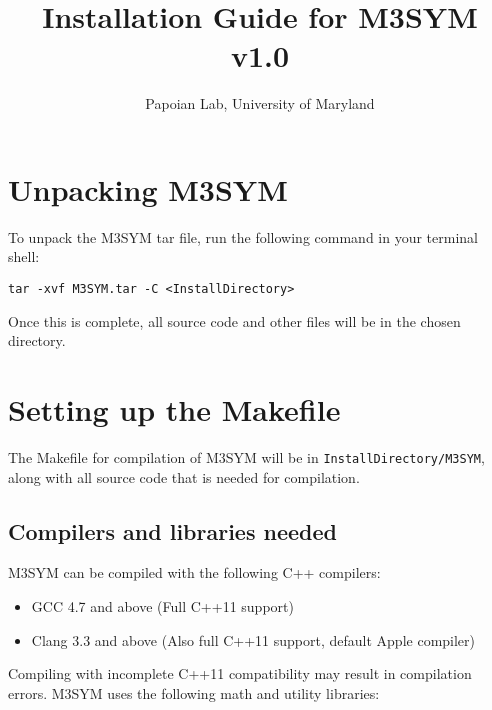 \documentclass[11pt, oneside]{article}   	%
\title{Installation Guide for M3SYM v1.0}
\author{Papoian Lab, University of Maryland}
\date{}							%
\begin{document}
\maketitle

\tableofcontents
\newpage

\section{Unpacking M3SYM}
 
 To unpack the M3SYM tar file, run the following command in your terminal shell: \newline \newline \centerline{\texttt{tar -xvf M3SYM.tar -C <InstallDirectory>}} \newline \newline Once this is complete, all source code and other files will be in the chosen directory.
 
 
\section{Setting up the Makefile}

The Makefile for compilation of M3SYM will be in \texttt{InstallDirectory/M3SYM}, along with all source code that is needed for compilation.

\subsection {Compilers and libraries needed}

M3SYM can be compiled with the following C++ compilers:

\begin{itemize}
\item GCC 4.7 and above (Full C++11 support)
\item  Clang 3.3 and above (Also full C++11 support, default Apple compiler)
\end{itemize}  

\noindent Compiling with incomplete C++11 compatibility may result in compilation errors. \newline M3SYM uses the following math and utility libraries:
\end{document}
